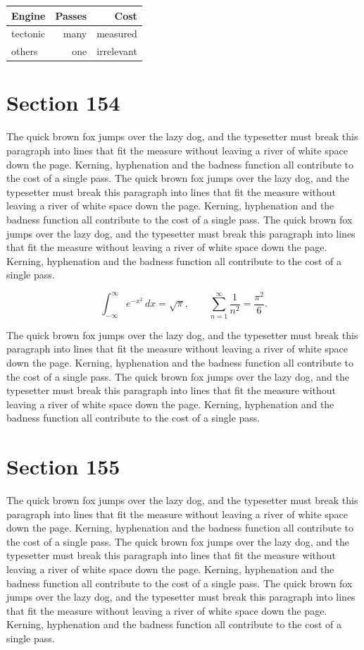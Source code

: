 \documentclass{article}
\begin{document}
\begin{center}
\begin{tabular}{lrr}
\toprule
Engine & Passes & Cost \\
\midrule
tectonic & many & measured \\
others & one & irrelevant \\
\bottomrule
\end{tabular}
\end{center}

\section{Section 154}
The quick brown fox jumps over the lazy dog, and the typesetter must break this paragraph into lines that fit the measure without leaving a river of white space down the page. Kerning, hyphenation and the badness function all contribute to the cost of a single pass. The quick brown fox jumps over the lazy dog, and the typesetter must break this paragraph into lines that fit the measure without leaving a river of white space down the page. Kerning, hyphenation and the badness function all contribute to the cost of a single pass. The quick brown fox jumps over the lazy dog, and the typesetter must break this paragraph into lines that fit the measure without leaving a river of white space down the page. Kerning, hyphenation and the badness function all contribute to the cost of a single pass. 

\begin{equation}
\int_{-\infty}^{\infty} e^{-x^{2}}\,dx = \sqrt{\pi}, \qquad
\sum_{n=1}^{\infty} \frac{1}{n^{2}} = \frac{\pi^{2}}{6}.
\end{equation}

The quick brown fox jumps over the lazy dog, and the typesetter must break this paragraph into lines that fit the measure without leaving a river of white space down the page. Kerning, hyphenation and the badness function all contribute to the cost of a single pass. The quick brown fox jumps over the lazy dog, and the typesetter must break this paragraph into lines that fit the measure without leaving a river of white space down the page. Kerning, hyphenation and the badness function all contribute to the cost of a single pass. 
\section{Section 155}
The quick brown fox jumps over the lazy dog, and the typesetter must break this paragraph into lines that fit the measure without leaving a river of white space down the page. Kerning, hyphenation and the badness function all contribute to the cost of a single pass. The quick brown fox jumps over the lazy dog, and the typesetter must break this paragraph into lines that fit the measure without leaving a river of white space down the page. Kerning, hyphenation and the badness function all contribute to the cost of a single pass. The quick brown fox jumps over the lazy dog, and the typesetter must break this paragraph into lines that fit the measure without leaving a river of white space down the page. Kerning, hyphenation and the badness function all contribute to the cost of a single pass. 
\end{document}
